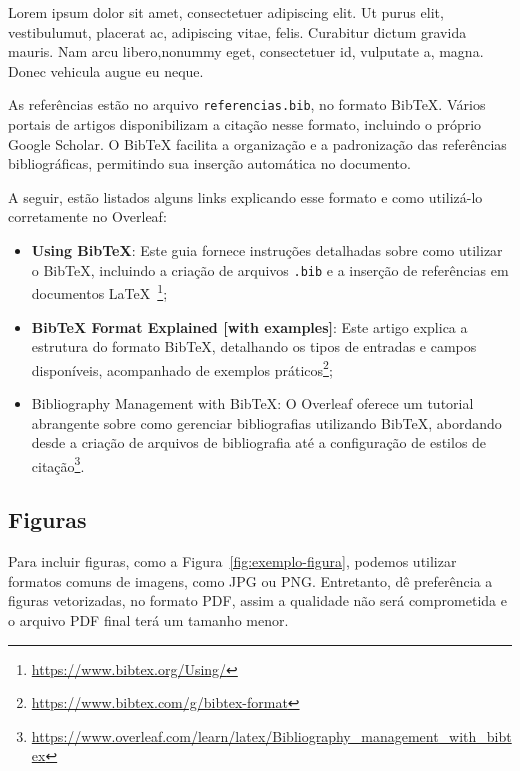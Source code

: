     \begin{citacao}
    Lorem ipsum dolor sit amet, consectetuer adipiscing elit. Ut purus elit, vestibulumut, placerat ac, adipiscing vitae, felis. Curabitur dictum gravida mauris. Nam arcu libero,nonummy eget, consectetuer id, vulputate a, magna. Donec vehicula augue eu neque. \cite{lamnaour2024semantic}
    \end{citacao}

    As referências estão no arquivo \texttt{referencias.bib}, no formato BibTeX. Vários portais de artigos disponibilizam a citação nesse formato, incluindo o próprio Google Scholar. O BibTeX facilita a organização e a padronização das referências bibliográficas, permitindo sua inserção automática no documento.  

    A seguir, estão listados alguns links explicando esse formato e como utilizá-lo corretamente no Overleaf:
    \begin{itemize}
        \item 
        \textbf{Using BibTeX}: Este guia fornece instruções detalhadas sobre como utilizar o BibTeX, incluindo a criação de arquivos \texttt{.bib} e a inserção de referências em documentos LaTeX~\footnote{\url{https://www.bibtex.org/Using/}}; 
        \item 
        \textbf{BibTeX Format Explained [with examples]}: Este artigo explica a estrutura do formato BibTeX, detalhando os tipos de entradas e campos disponíveis, acompanhado de exemplos práticos\footnote{\url{https://www.bibtex.com/g/bibtex-format}}; 
        \item 
        Bibliography Management with BibTeX: O Overleaf oferece um tutorial abrangente sobre como gerenciar bibliografias utilizando BibTeX, abordando desde a criação de arquivos de bibliografia até a configuração de estilos de citação\footnote{\url{https://www.overleaf.com/learn/latex/Bibliography_management_with_bibtex}}.
    \end{itemize}

\subsection{Figuras}

Para incluir figuras, como a Figura~\ref{fig:exemplo-figura}, podemos utilizar formatos comuns de imagens, como JPG ou PNG. Entretanto, dê preferência a figuras vetorizadas, no formato PDF, assim a qualidade não será comprometida e o arquivo PDF final terá um tamanho menor. 

